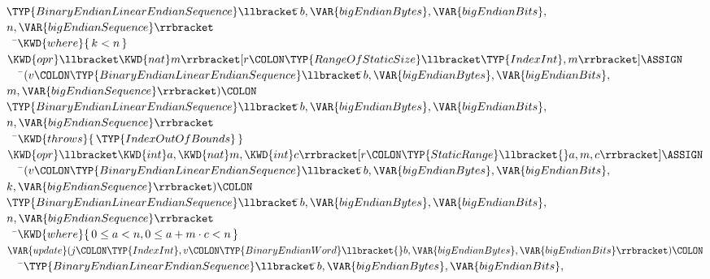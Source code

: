 \begin{Fortress}
\(     \TYP{BinaryEndianLinearEndianSequence}\llbracket\null\)\pushtabs\=\+\(b,\VAR{bigEndianBytes},\VAR{bigEndianBits},\)\\
\(                                       n,\VAR{bigEndianSequence}\rrbracket\)\-\-\\\poptabs\poptabs
{\tt~~}\pushtabs\=\+\(    \KWD{where} \{\,k < n\,\}\)\-\\\poptabs
\(  \KWD{opr} \llbracket\KWD{nat} m\rrbracket[r\COLON \TYP{RangeOfStaticSize}\llbracket\TYP{IndexInt},m\rrbracket] \ASSIGN\)\\
{\tt~~~}\pushtabs\=\+\(     (v\COLON \TYP{BinaryEndianLinearEndianSequence}\llbracket\null\)\pushtabs\=\+\(b,\VAR{bigEndianBytes},\VAR{bigEndianBits},\)\\
\(                                           m,\VAR{bigEndianSequence}\rrbracket)\COLON \)\-\\\poptabs
\(     \TYP{BinaryEndianLinearEndianSequence}\llbracket\null\)\pushtabs\=\+\(b,\VAR{bigEndianBytes},\VAR{bigEndianBits},\)\\
\(                                       n,\VAR{bigEndianSequence}\rrbracket\)\-\-\\\poptabs\poptabs
{\tt~~}\pushtabs\=\+\(    \KWD{throws} \{\,\TYP{IndexOutOfBounds}\,\}\)\-\\\poptabs
\(  \KWD{opr} \llbracket\KWD{int} a,\KWD{nat} m,\KWD{int} c\rrbracket[r\COLON \TYP{StaticRange}\llbracket{}a,m,c\rrbracket] \ASSIGN\)\\
{\tt~~~}\pushtabs\=\+\(     (v\COLON \TYP{BinaryEndianLinearEndianSequence}\llbracket\null\)\pushtabs\=\+\(b,\VAR{bigEndianBytes},\VAR{bigEndianBits},\)\\
\(                                           k,\VAR{bigEndianSequence}\rrbracket)\COLON \)\-\\\poptabs
\(     \TYP{BinaryEndianLinearEndianSequence}\llbracket\null\)\pushtabs\=\+\(b,\VAR{bigEndianBytes},\VAR{bigEndianBits},\)\\
\(                                       n,\VAR{bigEndianSequence}\rrbracket\)\-\-\\\poptabs\poptabs
{\tt~~}\pushtabs\=\+\(    \KWD{where} \{\,0 \leq a < n, 0 \leq a + m \cdot c < n\,\}\)\-\\\poptabs
\(  \VAR{update}(j\COLON \TYP{IndexInt}, v\COLON \TYP{BinaryEndianWord}\llbracket{}b, \VAR{bigEndianBytes}, \VAR{bigEndianBits}\rrbracket)\COLON \)\\
{\tt~~~}\pushtabs\=\+\(     \TYP{BinaryEndianLinearEndianSequence}\llbracket\null\)\pushtabs\=\+\(b,\VAR{bigEndianBytes},\VAR{bigEndianBits},\)\\

\end{Fortress}
